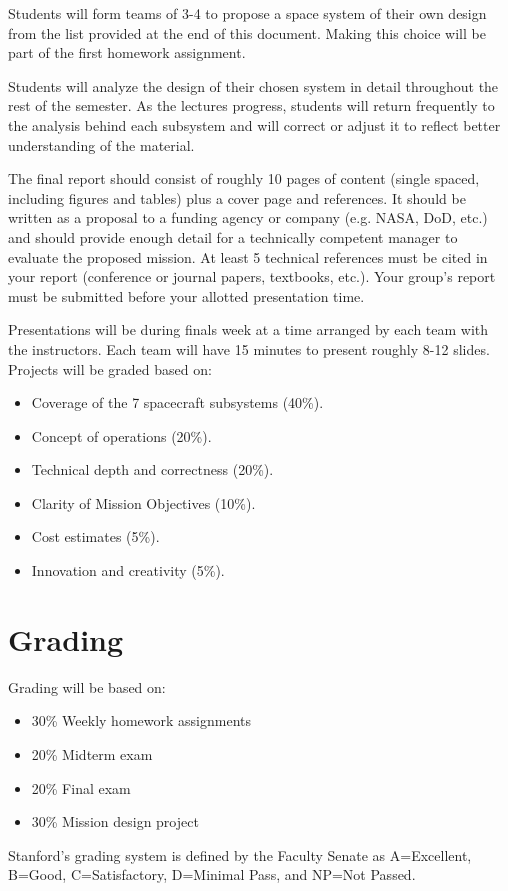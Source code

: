 \documentclass[11pt,letterpaper]{article}
\begin{document}
Students will form teams of 3-4 to propose a space system of their own design from the list provided at the end of this document. Making this choice will be part of the first homework assignment.

Students will analyze the design of their chosen system in detail throughout the rest of the semester. As the lectures progress, students will return frequently to the analysis behind each subsystem and will correct or adjust it to reflect better understanding of the material.

The final report should consist of roughly 10 pages of content (single spaced, including figures and tables) plus a cover page and references. It should be written as a proposal to a funding agency or company (e.g. NASA, DoD, etc.) and should provide enough detail for a technically competent manager to evaluate the proposed mission. At least 5 technical references must be cited in your report (conference or journal papers, textbooks, etc.). Your group's report must be submitted before your allotted presentation time.

Presentations will be during finals week at a time arranged by each team with the instructors. Each team will have 15 minutes to present roughly 8-12 slides. Projects will be graded based on:
\begin{itemize}
	\item Coverage of the 7 spacecraft subsystems (40\%).
	\item Concept of operations (20\%).
	\item Technical depth and correctness (20\%).
	\item Clarity of Mission Objectives (10\%).
	\item Cost estimates (5\%).
	\item Innovation and creativity (5\%).
\end{itemize}

\section*{Grading}

Grading will be based on:
\begin{itemize}
	\item 30\% Weekly homework assignments
	\item 20\% Midterm exam
	\item 20\% Final exam
	\item 30\% Mission design project
\end{itemize}
Stanford's grading system is defined by the Faculty Senate as A=Excellent, B=Good, C=Satisfactory, D=Minimal Pass, and NP=Not Passed.
\end{document}

